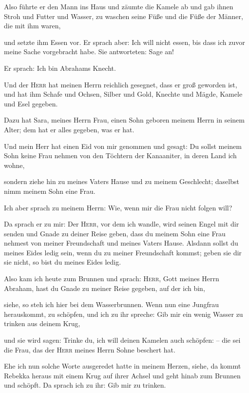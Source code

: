  Also führte er den Mann ins Haus und zäumte die Kamele
ab und gab ihnen Stroh und Futter und Wasser, zu waschen seine Füße und
die Füße der Männer, die mit ihm waren,

 und setzte ihm Essen vor. Er sprach aber: Ich will nicht
essen, bis dass ich zuvor meine Sache vorgebracht habe. Sie antworteten:
Sage an!

 Er sprach: Ich bin Abrahams Knecht.

 Und der \textsc{Herr} hat meinen Herrn reichlich
gesegnet, dass er groß geworden ist, und hat ihm Schafe und Ochsen,
Silber und Gold, Knechte und Mägde, Kamele und Esel gegeben.

 Dazu hat Sara, meines Herrn Frau, einen Sohn geboren
meinem Herrn in seinem Alter; dem hat er alles gegeben, was er hat.

 Und mein Herr hat einen Eid von mir genommen und gesagt:
Du sollst meinem Sohn keine Frau nehmen von den Töchtern der Kanaaniter,
in deren Land ich wohne,

 sondern ziehe hin zu meines Vaters Hause und zu meinem
Geschlecht; daselbst nimm meinem Sohn eine Frau.

 Ich aber sprach zu meinem Herrn: Wie, wenn mir die Frau
nicht folgen will?

 Da sprach er zu mir: Der \textsc{Herr}, vor dem ich
wandle, wird seinen Engel mit dir senden und Gnade zu deiner Reise
geben, dass du meinem Sohn eine Frau nehmest von meiner Freundschaft und
meines Vaters Hause.  Alsdann sollst du meines Eides
ledig sein, wenn du zu meiner Freundschaft kommst; geben sie dir sie
nicht, so bist du meines Eides ledig.

 Also kam ich heute zum Brunnen und sprach:
\textsc{Herr}, Gott meines Herrn Abraham, hast du Gnade zu meiner Reise
gegeben, auf der ich bin,

 siehe, so steh ich hier bei dem Wasserbrunnen. Wenn nun
eine Jungfrau herauskommt, zu schöpfen, und ich zu ihr spreche: Gib mir
ein wenig Wasser zu trinken aus deinem Krug,

 und sie wird sagen: Trinke du, ich will deinen Kamelen
auch schöpfen: -- die sei die Frau, das der \textsc{Herr} meines Herrn
Sohne beschert hat.

 Ehe ich nun solche Worte ausgeredet hatte in meinem
Herzen, siehe, da kommt Rebekka heraus mit einem Krug auf ihrer Achsel
und geht hinab zum Brunnen und schöpft. Da sprach ich zu ihr: Gib mir zu
trinken.

